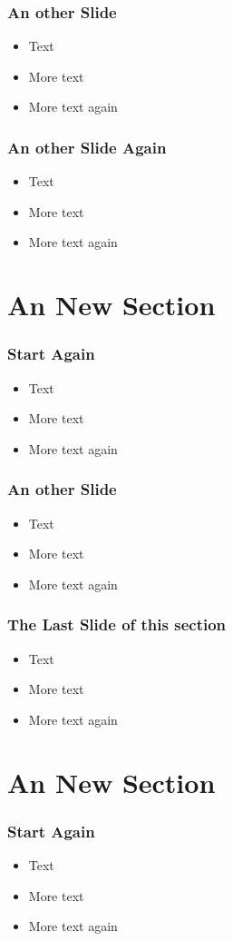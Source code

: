 \documentclass[handout,xcolor=pdftex,dvipsnames,table]{beamer}
\begin{document}
\begin{frame} 
\frametitle{An other Slide}
\begin{itemize}[<+->]
 \item Text
 \item More text
 \item More text again
\end{itemize}
\end{frame}

\begin{frame} 
\frametitle{An other Slide Again}
\begin{itemize}[<+->]
 \item Text
 \item More text
 \item More text again
\end{itemize}
\end{frame}

\section{An New Section}
\begin{frame} 
\frametitle{Start Again}
\begin{itemize}[<+->]
 \item Text
 \item More text
 \item More text again
\end{itemize}
\end{frame}

\begin{frame} 
\frametitle{An other Slide}
\begin{itemize}[<+->]
 \item Text
 \item More text
 \item More text again
\end{itemize}
\end{frame}

\begin{frame} 
\frametitle{The Last Slide of this section}
\begin{itemize}[<+->]
 \item Text
 \item More text
 \item More text again
\end{itemize}
\end{frame}


\section{An New Section}
\begin{frame} 
\frametitle{Start Again}
\begin{itemize}[<+->]
 \item Text
 \item More text
 \item More text again
\end{itemize}
\end{frame}
\end{document}
